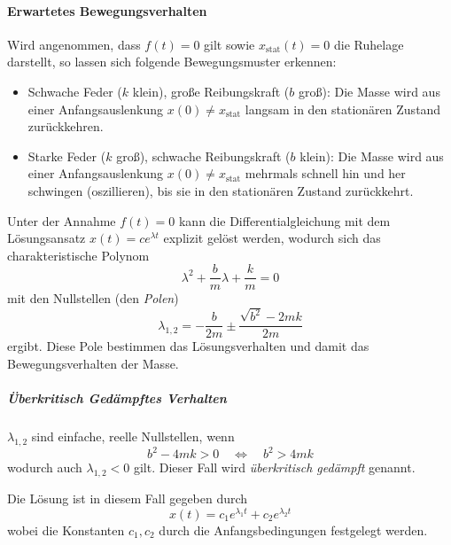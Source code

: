 \documentclass[a4paper, 11pt, accentcolor = tud3b]{tudreport}
\begin{document}
					\paragraph{Erwartetes Bewegungsverhalten}
						Wird angenommen, dass \( f(t) = 0 \) gilt sowie \( x_\text{stat}(t) = 0 \) die Ruhelage darstellt, so lassen sich folgende Bewegungsmuster erkennen:
						\begin{itemize}
							\item Schwache Feder (\(k\) klein), große Reibungskraft (\(b\) groß): Die Masse wird aus einer Anfangsauslenkung \( x(0) \neq x_\text{stat} \) langsam in den stationären Zustand zurückkehren.
							\item Starke Feder (\(k\) groß), schwache Reibungskraft (\(b\) klein): Die Masse wird aus einer Anfangsauslenkung \( x(0) \neq x_\text{stat} \) mehrmals schnell hin und her schwingen (oszillieren), bis sie in den stationären Zustand zurückkehrt.
						\end{itemize}
					
						Unter der Annahme \( f(t) = 0 \) kann die Differentialgleichung mit dem Lösungsansatz \( x(t) = ce^{\lambda t} \) explizit gelöst werden, wodurch sich das charakteristische Polynom
						\begin{equation*}
							\lambda^2 + \frac{b}{m} \lambda + \frac{k}{m} = 0
						\end{equation*}
						mit den Nullstellen (den \emph{Polen})
						\begin{equation*}
							\lambda_{1, 2} = -\frac{b}{2m} \pm \frac{\sqrt{b^2} - 2mk}{2m}
						\end{equation*}
						ergibt. Diese Pole bestimmen das Lösungsverhalten und damit das Bewegungsverhalten der Masse.
						
						\subparagraph{Überkritisch Gedämpftes Verhalten}
							\( \lambda_{1, 2} \) sind einfache, reelle Nullstellen, wenn
							\begin{equation*}
								b^2 - 4mk > 0 \quad\iff\quad b^2 > 4mk
							\end{equation*}
							wodurch auch \( \lambda_{1, 2} < 0 \) gilt. Dieser Fall wird \emph{überkritisch gedämpft} genannt.
							
							Die Lösung ist in diesem Fall gegeben durch
							\begin{equation*}
								x(t) = c_1 e^{\lambda_1 t} + c_2 e^{\lambda_2 t}
							\end{equation*}
							wobei die Konstanten \( c_1, c_2 \) durch die Anfangsbedingungen festgelegt werden.
						
\end{document}

